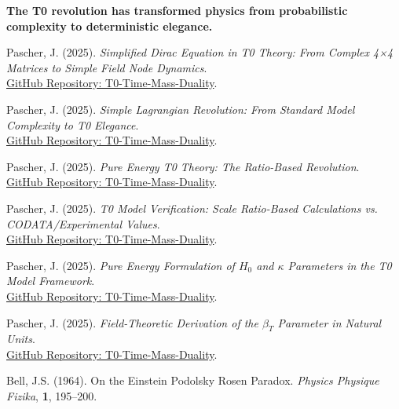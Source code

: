 \documentclass[12pt,a4paper]{article}
\begin{document}
	\textbf{The T0 revolution has transformed physics from probabilistic \\
		complexity to deterministic elegance.}
	
	\begin{thebibliography}{99}
		Pascher, J. (2025). \textit{Simplified Dirac Equation in T0 Theory: From Complex 4×4 Matrices to Simple Field Node Dynamics}. \\
		\href{https://github.com/jpascher/T0-Time-Mass-Duality/blob/main/2/pdf/diracVereinfachtEn.pdf}{GitHub Repository: T0-Time-Mass-Duality}.
		
		Pascher, J. (2025). \textit{Simple Lagrangian Revolution: From Standard Model Complexity to T0 Elegance}. \\
		\href{https://github.com/jpascher/T0-Time-Mass-Duality/blob/main/2/pdf/LagrandianVergleichEn.pdf}{GitHub Repository: T0-Time-Mass-Duality}.
		
		Pascher, J. (2025). \textit{Pure Energy T0 Theory: The Ratio-Based Revolution}. \\
		\href{https://github.com/jpascher/T0-Time-Mass-Duality/blob/main/2/pdf/Elimination_Of_Mass_Dirac_Lag.pdf}{GitHub Repository: T0-Time-Mass-Duality}.
		
		Pascher, J. (2025). \textit{T0 Model Verification: Scale Ratio-Based Calculations vs. CODATA/Experimental Values}. \\
		\href{https://github.com/jpascher/T0-Time-Mass-Duality/blob/main/2/pdf/Elimination_Of_Mass_Dirac_Tabelle.pdf}{GitHub Repository: T0-Time-Mass-Duality}.
		
		Pascher, J. (2025). \textit{Pure Energy Formulation of $H_0$ and $\kappa$ Parameters in the T0 Model Framework}. \\
		\href{https://github.com/jpascher/T0-Time-Mass-Duality/blob/main/2/pdf/Ho_EnergieEn.pdf}{GitHub Repository: T0-Time-Mass-Duality}.
		
		Pascher, J. (2025). \textit{Field-Theoretic Derivation of the $\beta_T$ Parameter in Natural Units}. \\
		\href{https://github.com/jpascher/T0-Time-Mass-Duality/blob/main/2/pdf/DerivationVonBetaEn.pdf}{GitHub Repository: T0-Time-Mass-Duality}.
		
		Bell, J.S. (1964). On the Einstein Podolsky Rosen Paradox. \textit{Physics Physique Fizika}, \textbf{1}, 195--200.
		

\end{thebibliography}
\end{document}
